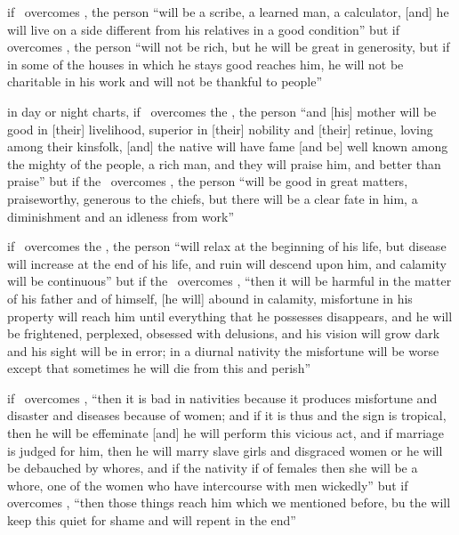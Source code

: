 \begin{description}[style=multiline,leftmargin=1.5cm]
\item[\Jupiter\Square\Mercury] if \Jupiter\, overcomes \Mercury, the person ``will be a scribe, a learned man, a calculator, [and] he will live on a side different from his relatives in a good condition'' but if \Mercury\, overcomes \Jupiter, the person ``will not be rich, but he will be great in generosity, but if in some of the houses in which he stays good reaches him, he will not be charitable in his work and will not be thankful to people''

\item[\Jupiter\Square\Moon] in day or night charts, if \Jupiter\, overcomes the \Moon, the person ``and [his] mother will be good in [their] livelihood, superior in [their] nobility and [their] retinue, loving among their kinsfolk, [and] the native will have fame [and be] well known among the mighty of the people, a rich man, and they will praise him, and better than praise'' but if the \Moon\, overcomes \Jupiter, the person ``will be good in great matters, praiseworthy, generous to the chiefs, but there will be a clear fate in him, a diminishment and an idleness from work''

\item[\Mars\Square\Sun] if \Mars\, overcomes the \Sun, the person ``will relax at the beginning of his life, but disease will increase at the end of his life, and ruin will descend upon him, and calamity will be continuous'' but if the \Sun\, overcomes \Mars, ``then it will be harmful in the matter of his father and of himself, [he will] abound in calamity, misfortune in his property will reach him until everything that he possesses disappears, and he will be frightened, perplexed, obsessed with delusions, and his vision will grow dark and his sight will be in error; in a diurnal nativity the misfortune will be worse except that sometimes he will die from this and perish''

\item[\Mars\Square\Venus] if \Mars\, overcomes \Venus, ``then it is bad in nativities because it produces misfortune and disaster and diseases because of women; and if it is thus and the sign is tropical, then he will be effeminate [and] he will perform this vicious act, and if marriage is judged for him, then he will marry slave girls and disgraced women or he will be debauched by whores, and if the nativity if of females then she will be a whore, one of the women who have intercourse with men wickedly'' but if \Venus\, overcomes \Mars, ``then those things reach him which we mentioned before, bu the will keep this quiet for shame and will repent in the end''


\end{description}
